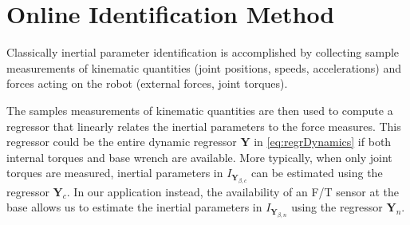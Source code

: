 \section{Online Identification Method}
\label{sec:onlineIdentification}
Classically inertial parameter identification is accomplished by collecting sample measurements of kinematic quantities (joint positions, speeds, accelerations) and forces acting on the robot (external forces, joint torques).

The samples measurements of kinematic quantities are then used to compute a regressor that linearly relates
the inertial parameters to the force measures. This regressor could be the entire dynamic regressor $\mathbf{Y}$ in \eqref{eq:regrDynamics} if both internal torques and base wrench are available. More typically, when only joint torques are measured, inertial parameters in $I_{\mathbf {Y}_{\beta,c}}$ can be estimated using the regressor $\mathbf{Y}_c$. In our application instead, the availability of an F/T sensor at the base allows us to estimate the inertial parameters in $I_{\mathbf {Y}_{\beta,n}}$ using the regressor $\mathbf{Y}_n$.

